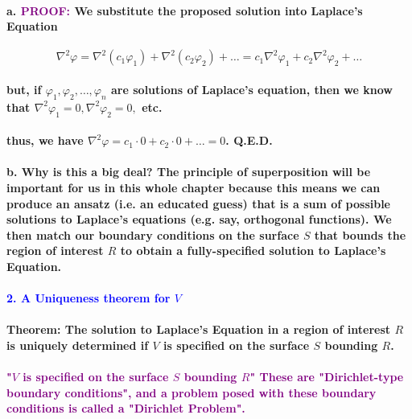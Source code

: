 \documentclass{article}
\begin{document}
\paragraph{\indent a. \textcolor{purple}{PROOF:} We substitute the proposed solution into Laplace's Equation}
\begin{equation*}
    \nabla^2 \varphi=\nabla^2(c_1\varphi_1)+\nabla^2(c_2\varphi_2)+\dots=c_1\nabla^2\varphi_1+c_2\nabla^2\varphi_2+\dots
\end{equation*}
\paragraph{\indent but, if $\varphi_1,\varphi_2,\dots, \varphi_n$ are solutions of Laplace's equation, then we know that $\nabla^2\varphi_1=0,\nabla^2\varphi_2=0,$ etc.}
\paragraph{\indent thus, we have $\nabla^2\varphi=c_1\cdot0+c_2\cdot 0+\dots =0$. Q.E.D.}
\paragraph{\indent b. Why is this a big deal? The principle of superposition will be important for us in this whole chapter because this means we can produce an ansatz (i.e. an educated guess) that is a sum of possible solutions to Laplace's equations (e.g. say, orthogonal functions). We then match our boundary conditions on the surface $S$ that bounds the region of interest $R$ to obtain a fully-specified solution to Laplace's Equation.}
\paragraph{\textcolor{blue}{2. A Uniqueness theorem for $V$}}
\paragraph{Theorem: The solution to Laplace's Equation in a region of interest $R$ is uniquely determined if $V$ is specified on the surface $S$ bounding $R$.}
\paragraph{\indent \textcolor{purple}{"$V$ is specified on the surface $S$ bounding $R$" These are "Dirichlet-type boundary conditions", and a problem posed with these boundary conditions is called a "Dirichlet Problem".}}
\end{document}
